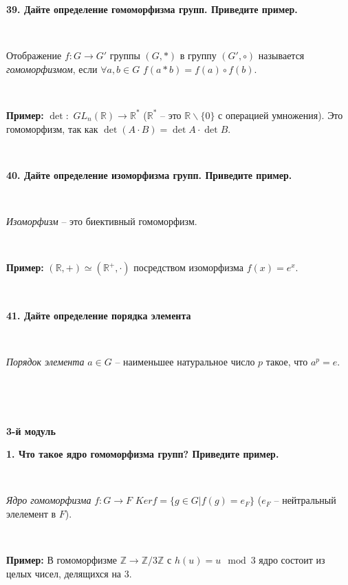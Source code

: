 \documentclass{article}
\begin{document}
	\textbf{39. Дайте определение гомоморфизма групп. Приведите пример.}
	
	{
		$\;$
		\setlength{\parindent}{0.4cm}
		\hangindent=0.4cm
		
		
		Отображение $f:G\rightarrow G'$ группы $(G, \ast)$ в группу $(G', \circ)$ называется \textit{гомоморфизмом}, если $\forall a, b\in G$ $f(a\ast b)=f(a)\circ f(b)$.
		
		$\;$
		
		\textbf{Пример:} $\det:$ $GL_n(\mathbb{R})\rightarrow\mathbb{R}^{\ast}$ ($\mathbb{R}^{\ast}$ -- это $\mathbb{R}\backslash\{0\}$ с операцией умножения). Это гомоморфизм, так как $\det(A\cdot B)=\det A\cdot \det B$.
		
		$\;$
		\setlength{\parindent}{0cm}
		\hangindent=0cm
	}
	
	\textbf{40. Дайте определение изоморфизма групп. Приведите пример.}
	
	{
		$\;$
		\setlength{\parindent}{0.4cm}
		\hangindent=0.4cm
		
		
		\textit{Изоморфизм} -- это биективный гомоморфизм.
		
		$\;$
		
		\textbf{Пример:} $(\mathbb{R}, +)\simeq(\mathbb{R}^+, \cdot)$ посредством изоморфизма $f(x)=e^x$.
		
		$\;$
		\setlength{\parindent}{0cm}
		\hangindent=0cm
	}
	
	\textbf{41. Дайте определение порядка элемента}
	
	{
		$\;$
		\setlength{\parindent}{0.4cm}
		\hangindent=0.4cm
		
		
		\textit{Порядок элемента} $a\in G$ -- наименьшее натуральное число $p$ такое, что $a^p=e$.
		
		$\;$
		\setlength{\parindent}{0cm}
		\hangindent=0cm
	}
	
	\Large
	\centering
	
	$\;$
	
	\textbf{3-й модуль}
	
	\flushleft
	\small
	
	\textbf{1. Что такое ядро гомоморфизма групп? Приведите пример.} 
	
	{
		$\;$
		\setlength{\parindent}{0.4cm}
		\hangindent=0.4cm
		
		
		\textit{Ядро гомоморфизма} $f:G\rightarrow F$ $Ker f=\{g\in G|f(g)=e_F \}$ ($e_F$ -- нейтральный элелемент в $F$).
		
		$\;$
		
		\textbf{Пример:} В гомоморфизме $\mathbb{Z}\rightarrow\mathbb{Z}/3\mathbb{Z}$ с $h(u)=u \mod 3$ ядро состоит из целых чисел, делящихся на 3.
		
		$\;$
		\setlength{\parindent}{0cm}
		\hangindent=0cm
	}
	
\end{document}
